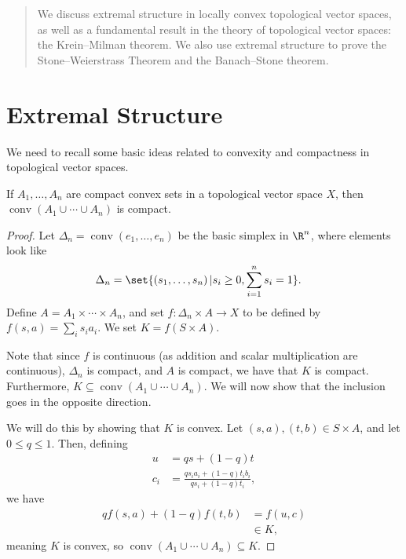 \documentclass[10pt]{mypackage}
\begin{document}
\RaggedRight
\begin{abstract}
  \noindent We discuss extremal structure in locally convex topological vector spaces, as well as a fundamental result in the theory of topological vector spaces: the Krein--Milman theorem. We also use extremal structure to prove the Stone--Weierstrass Theorem and the Banach--Stone theorem.
\end{abstract}
\section{Extremal Structure}%
We need to recall some basic ideas related to convexity and compactness in topological vector spaces.
\begin{theorem}
  If $A_1,\dots,A_n$ are compact convex sets in a topological vector space $X$, then $\operatorname{conv}\left( A_1\cup\cdots\cup A_n \right)$ is compact.
\end{theorem}
\begin{proof}
  Let $\Delta_{n} = \operatorname{conv}\left( e_1,\dots,e_n \right)$ be the basic simplex in $\R^n$, where elements look like
  \begin{align*}
    \Delta_n &= \set{\left( s_1,\dots,s_n \right) | s_i\geq 0,\sum_{i=1}^{n}s_i = 1}.
  \end{align*}
  Define $A = A_1\times\cdots\times A_n$, and set $f\colon \Delta_n\times A \rightarrow X$ to be defined by $f\left( s,a \right) = \sum_{i}s_ia_i$. We set $K = f\left( S\times A \right)$.\newline

  Note that since $f$ is continuous (as addition and scalar multiplication are continuous), $\Delta_n$ is compact, and $A$ is compact, we have that $K$ is compact. Furthermore, $K\subseteq \operatorname{conv}\left( A_1\cup\cdots\cup A_n \right)$. We will now show that the inclusion goes in the opposite direction.\newline

  We will do this by showing that $K$ is convex. Let $\left( s,a \right),\left( t,b \right)\in S\times A$, and let $0\leq q \leq 1$. Then, defining
  \begin{align*}
    u &= qs + \left( 1-q \right)t\\
    c_i &= \frac{qs_ia_i + \left( 1-q \right)t_ib_i}{qs_i + \left( 1-q \right)t_i},
  \end{align*}
  we have
  \begin{align*}
    qf\left( s,a \right) + \left( 1-q \right)f\left( t,b \right) &= f\left( u,c \right)\\
                                                                 &\in K,
  \end{align*}
  meaning $K$ is convex, so $\operatorname{conv}\left( A_1\cup\cdots\cup A_n \right)\subseteq K$.
\end{proof}
\end{document}
